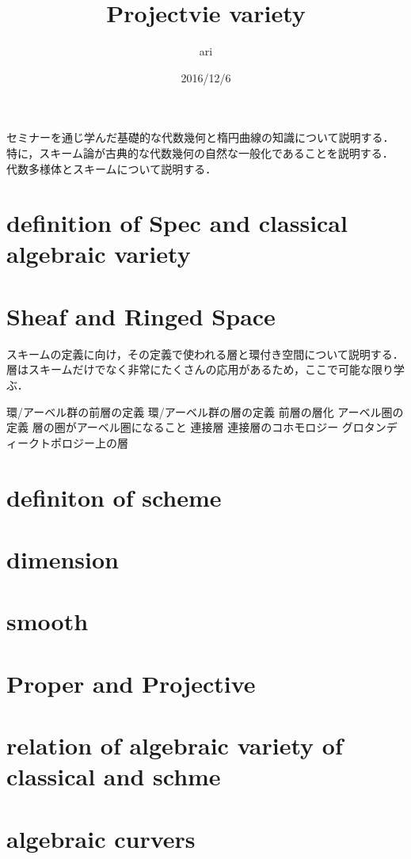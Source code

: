\documentclass{ujarticle}
\author{ari}
\title{Projectvie variety}
\date{2016/12/6}
\begin{document}
\maketitle
\tableofcontents
セミナーを通じ学んだ基礎的な代数幾何と楕円曲線の知識について説明する．
特に，スキーム論が古典的な代数幾何の自然な一般化であることを説明する．
代数多様体とスキームについて説明する．

\section{definition of Spec and classical algebraic variety}
\label{sec:definition of Spec}


\section{Sheaf and Ringed Space}
スキームの定義に向け，その定義で使われる層と環付き空間について説明する．
層はスキームだけでなく非常にたくさんの応用があるため，ここで可能な限り学ぶ．

環/アーベル群の前層の定義
環/アーベル群の層の定義
前層の層化
アーベル圏の定義
層の圏がアーベル圏になること
連接層
連接層のコホモロジー
グロタンディークトポロジー上の層


\section{definiton of scheme}
\label{sec:definiton of scheme}


\section{dimension}
\label{sec:dimension}

\section{smooth}
\label{sec:smooth}

\section{Proper and Projective}
\label{sec:Proper and Projective}


\section{relation of algebraic variety of classical and schme}
\label{sec:algebraic variety}

\section{algebraic curvers}
\label{sec:algebraic curvers}
\end{document}
